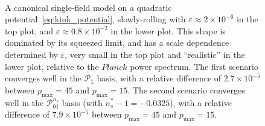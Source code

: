 \documentclass[a4paper,12pt]{extarticle}
\newcommand{\Pmax}{p_\text{max}}
\newcommand{\Linvk}{\mathcal{P}_1}
\newcommand{\Lnsboth}{\mathcal{P}^{n_s}_{01}}
\begin{document}
\begin{figure}[!pth]
\centering
    \\[-2ex]
\caption{
    A canonical single-field model on a quadratic
    potential~\eqref{eq:kink_potential},
    slowly-rolling with $\varepsilon\approx2\times10^{-6}$
    in the top plot, and $\varepsilon\approx0.8\times10^{-2}$
    in the lower plot.
    This shape is dominated by its squeezed limit,
    and has a scale dependence determined by $\varepsilon$,
    very small in the top plot and ``realistic'' in the
    lower plot, relative to the $\textit{Planck}$ power spectrum.
    The first scenario converges well in the $\Linvk$ basis,
    with a relative difference of $2.7\times10^{-5}$
    between $\Pmax=45$ and $\Pmax=15$.
    The second scenario converges well in the $\Lnsboth$ basis
    (with $n_s^{*}-1 = -0.0325$),
    with a relative difference of $7.9\times10^{-5}$
    between $\Pmax=45$ and $\Pmax=15$.
}\label{slice_plot_malda}
\end{figure}
\end{document}
